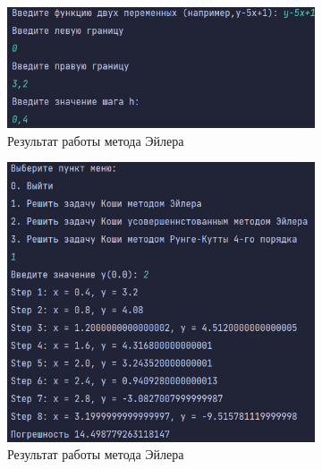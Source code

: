\documentclass[12pt]{article}
\begin{document}
\clearpage

\begin{figure}[ht]
\centering
\begin{subfigure}{0.4\textwidth}
\includegraphics[width=\linewidth]{menu_Koshi.png}
\caption{Результат работы метода Эйлера}
\end{subfigure}
\begin{subfigure}{0.4\textwidth}
\includegraphics[width=\linewidth]{euler_method.png}
\caption{Результат работы метода Эйлера}
\end{subfigure}
\hfill
\begin{subfigure}{0.4\textwidth}

\end{subfigure}
\end{figure}
\end{document}
